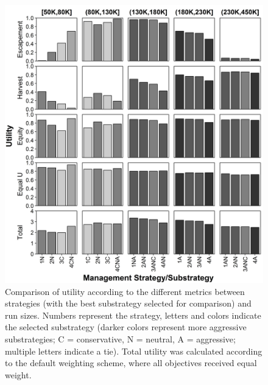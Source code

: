 \documentclass[12pt,]{book}
\theoremstyle{definition}
\theoremstyle{definition}
\theoremstyle{definition}
\theoremstyle{remark}
\begin{document}
\begin{singlespace}
\clearpage
\begin{figure}
  \centering
  \includegraphics{img/Ch3/btwn-ms-utilities.jpg}
  \caption{Comparison of utility according to the different metrics between strategies (with the best substrategy selected for comparison) and run sizes. Numbers represent the strategy, letters and colors indicate the selected substrategy (darker colors represent more aggressive substrategies; C = conservative, N = neutral, A = aggressive; multiple letters indicate a tie). Total utility was calculated according to the default weighting scheme, where all objectives received equal weight.}
  \label{fig:btwn-ms-utilities}
\end{figure}


\end{singlespace}
\end{document}
